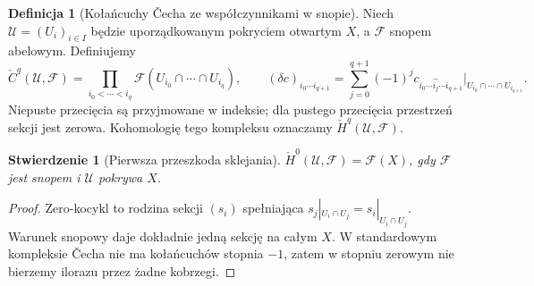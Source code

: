 \documentclass[11pt,a4paper,oneside]{report}
\theoremstyle{plain}
\newtheorem{stwierdzenie}[twierdzenie]{Stwierdzenie}
\theoremstyle{definition}
\newtheorem{definicja}[twierdzenie]{Definicja}
\theoremstyle{remark}
\begin{document}
\begin{definicja}[Kołańcuchy \v{C}echa ze współczynnikami w snopie]
Niech $\mathcal U=(U_i)_{i\in I}$ będzie uporządkowanym pokryciem
otwartym $X$, a $\mathcal F$ snopem abelowym. Definiujemy
\[
\check C^q(\mathcal U,\mathcal F)
=\prod_{i_0<\cdots<i_q}\mathcal F(U_{i_0}\cap\cdots\cap U_{i_q}),
\qquad
(\delta c)_{i_0\cdots i_{q+1}}
=\sum_{j=0}^{q+1}(-1)^j
c_{i_0\cdots\widehat{i_j}\cdots i_{q+1}}
\big|_{U_{i_0}\cap\cdots\cap U_{i_{q+1}}}.
\]
Niepuste przecięcia są przyjmowane w indeksie; dla pustego
przecięcia przestrzeń sekcji jest zerowa. Kohomologię tego
kompleksu oznaczamy $\check H^q(\mathcal U,\mathcal F)$.
\end{definicja}

\begin{stwierdzenie}[Pierwsza przeszkoda sklejania]
$\check H^0(\mathcal U,\mathcal F)=\mathcal F(X)$,
gdy $\mathcal F$ jest snopem i $\mathcal U$ pokrywa $X$.
\end{stwierdzenie}
\begin{proof}
Zero-kocykl to rodzina sekcji $(s_i)$ spełniająca
$s_j|_{U_i\cap U_j}=s_i|_{U_i\cap U_j}$.
Warunek snopowy daje dokładnie jedną sekcję na całym $X$.
W standardowym kompleksie \v{C}echa nie ma kołańcuchów stopnia $-1$,
zatem w stopniu zerowym nie bierzemy ilorazu przez żadne kobrzegi.
\end{proof}
\end{document}
